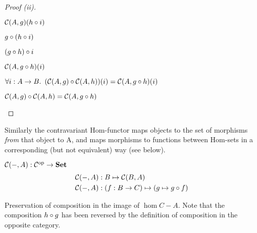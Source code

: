\begin{prop}
\begin{proof}[Proof (ii)]
\begin{itemize}
\begin{itemize}
          \step[=] $\mathcal{C}(A, g)(h\circ i)$
            \marginnote{\Def-\ref{def:co-hom}}

          \step[=] $g\circ (h\circ i)$
            \marginnote{\Def-\ref{def:co-hom}}

          \step[=] $(g\circ h)\circ i$
            \marginnote{\Assoc-$\compose$}

          \step[=] $\mathcal{C}(A, g\circ h)(i)$
            \marginnote{\Def-\ref{def:co-hom}}
        \end{itemize}

      \step[\imps]
        $\forall i : A\to B\ldotp~(\mathcal{C}(A, g)\circ\mathcal{C}(A, h))(i) = \mathcal{C}(A, g\circ h)(i)$
        \marginnote{$\forall$-\Intro}

      \step[\iffs]
        $\mathcal{C}(A, g)\circ\mathcal{C}(A, h) = \mathcal{C}(A, g\circ h)$
        \marginnote{\Def-$=$}
        \qedhere
    \end{itemize}
  \end{proof}
\end{prop}

Similarly the contravariant Hom-functor maps objects to the set of morphisms \textit{from} that object to A, and maps morphisms to functions between Hom-sets in a corresponding (but not equivalent) way (see below).

\begin{definition}\label{def:contra-hom}
  $\mathcal{C}(-, A) : \mathcal{C}^{\text{op}} \to \mathbf{Set}$
  \begin{align*}
    \mathcal{C}(-, A) & : B \mapsto \mathcal{C}(B, A)\\
    \mathcal{C}(-, A) & : (f : B \to C) \mapsto (g \mapsto g \circ f)
  \end{align*}
\end{definition}

\begin{marginfigure}[6em]
  \caption{Preservation of composition in the image of $\hom{C}{-}{A}$. Note that the composition $h\circ g$ has been reversed by the definition of composition in the opposite category.}\label{fig:contra-functor}
\end{marginfigure}

